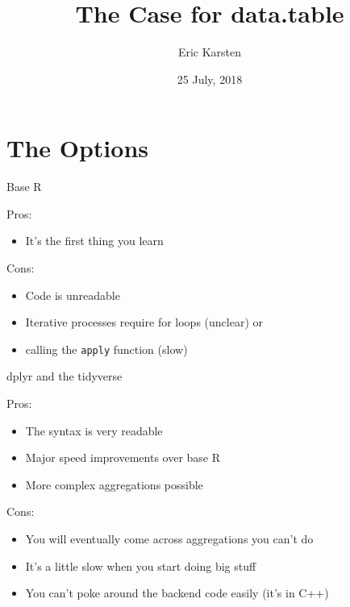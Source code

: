 \documentclass[ignorenonframetext,]{beamer}
\title{The Case for data.table}
\author{Eric Karsten}
\date{25 July, 2018}
\providecommand{\tightlist}{%
  \setlength{\itemsep}{0pt}\setlength{\parskip}{0pt}}
\begin{document}
\frame{\titlepage}

\hypertarget{the-options}{%
\section{The Options}\label{the-options}}

\begin{frame}[fragile]{Base R}
\protect\hypertarget{base-r}{}

Pros:

\begin{itemize}
\tightlist
\item
  It's the first thing you learn
\end{itemize}

Cons:

\begin{itemize}
\tightlist
\item
  Code is unreadable
\item
  Iterative processes require for loops (unclear) or
\item
  calling the \texttt{apply} function (slow)
\end{itemize}

\end{frame}

\begin{frame}{dplyr and the tidyverse}
\protect\hypertarget{dplyr-and-the-tidyverse}{}

Pros:

\begin{itemize}
\tightlist
\item
  The syntax is very readable
\item
  Major speed improvements over base R
\item
  More complex aggregations possible
\end{itemize}

Cons:

\begin{itemize}
\tightlist
\item
  You will eventually come across aggregations you can't do
\item
  It's a little slow when you start doing big stuff
\item
  You can't poke around the backend code easily (it's in C++)
\end{itemize}

\end{frame}
\end{document}
